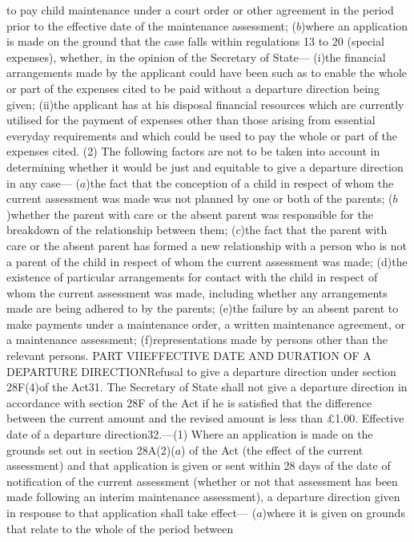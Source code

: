 \documentclass[a4paper]{article}
\begin{document}
to pay child maintenance under a court order or other agreement in the period
prior to the effective date of the maintenance assessment;
($b$)where an application is made on the ground that the case falls within
regulations 13 to 20 (special expenses), whether, in the opinion of the
Secretary of State—
(i)the financial arrangements made by the applicant could have been such as to
enable the whole or part of the expenses cited to be paid without a departure
direction being given;
(ii)the applicant has at his disposal financial resources which are currently
utilised for the payment of expenses other than those arising from essential
everyday requirements and which could be used to pay the whole or part of the
expenses cited.
(2) The following factors are not to be taken into account in determining
whether it would be just and equitable to give a departure direction in any
case—
($a$)the fact that the conception of a child in respect of whom the current
assessment was made was not planned by one or both of the parents;
($b$)whether the parent with care or the absent parent was responsible for the
breakdown of the relationship between them;
($c$)the fact that the parent with care or the absent parent has formed a new
relationship with a person who is not a parent of the child in respect of whom
the current assessment was made;
(d)the existence of particular arrangements for contact with the child in
respect of whom the current assessment was made, including whether any
arrangements made are being adhered to by the parents;
(e)the failure by an absent parent to make payments under a maintenance order, a
written maintenance agreement, or a maintenance assessment;
(f)representations made by persons other than the relevant persons.
PART VIIEFFECTIVE DATE AND DURATION OF A DEPARTURE DIRECTIONRefusal to give a
departure direction under section 28F(4)of the Act31. The Secretary of State
shall not give a departure direction in accordance with section 28F of the Act
if he is satisfied that the difference between the current amount and the
revised amount is less than £1.00.
Effective date of a departure direction32.—(1) Where an application is made on
the grounds set out in section 28A(2)($a$) of the Act (the effect of the current
assessment) and that application is given or sent within 28 days of the date of
notification of the current assessment (whether or not that assessment has been
made following an interim maintenance assessment), a departure direction given
in response to that application shall take effect—
($a$)where it is given on grounds that relate to the whole of the period between
\end{document}
